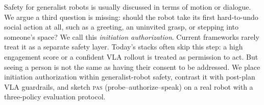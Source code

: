 Safety for generalist robots is usually discussed in terms of motion or
dialogue. We argue a third question is missing: should the robot take
its first hard-to-undo social action at all, such as a greeting, an uninvited
grasp, or stepping into someone's space? We call this \emph{initiation
authorization}. Current frameworks rarely treat it as a separate safety
layer. Today's stacks often skip this step: a high engagement score or
a confident VLA rollout is treated as permission to act. But seeing a
person is not the same as having their consent to be addressed. We
place initiation authorization within generalist-robot safety, contrast
it with post-plan VLA guardrails, and sketch \textsc{pas} (probe--authorize--speak) on a
real robot with a three-policy evaluation protocol.
